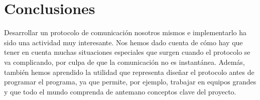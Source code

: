 \section{Conclusiones}
Desarrollar un protocolo de comunicación nosotros mismos e implementarlo ha sido una actividad muy interesante. Nos hemos dado cuenta de cómo hay que tener en cuenta muchas situaciones especiales que surgen cuando el protocolo se va complicando, por culpa de que la comunicación no es instantánea. Además, también hemos aprendido la utilidad que representa diseñar el protocolo antes de programar el programa, ya que permite, por ejemplo, trabajar en equipos grandes y que todo el mundo comprenda de antemano conceptos clave del proyecto.